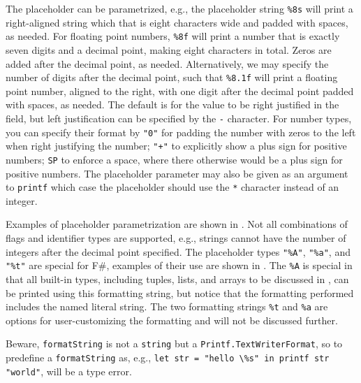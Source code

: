 \documentclass[fsharpnotes.tex]{subfiles}
\begin{document}
The placeholder can be parametrized, e.g.,  the placeholder string \lstinline{%8s} %
will print a right-aligned string which that is eight characters wide and padded with spaces, as needed. For floating point numbers, \lstinline{%8f} %
will print a number that is exactly seven digits and a decimal point, making eight characters in total. Zeros are added after the decimal point, as needed. Alternatively, we may specify the number of digits after the decimal point, such that \lstinline{%8.1f} %
will print a floating point number, aligned to the right, with one digit after the decimal point padded with spaces, as needed. The default is for the value to be right justified in the field, but left justification can be specified by the \lstinline!-! character. For number types, you can specify their format by \lstinline!"0"! for padding the number with zeros to the left when right justifying the number; \lstinline!"+"! to explicitly show a plus sign for positive numbers; \lstinline!SP! to enforce a space, where there otherwise would be a plus sign for positive numbers. The placeholder parameter may also be given as an argument to \lstinline{printf} which case the placeholder should use the \lstinline!*! character instead of an integer.

Examples of placeholder parametrization are shown in .
%
%
Not all combinations of flags and identifier types are supported, e.g., strings cannot have the number of integers after the decimal point specified.
The placeholder types \lstinline{"%A"}, %
\lstinline{"%a"}, %
and \lstinline{"%t"} %
are special for F\#, examples of their use are shown in .
%
%
The \lstinline!%A! %
is special in that all built-in types, including tuples, lists, and arrays to be discussed in , can be printed using this formatting string, but notice that the formatting performed includes the named literal string. The two formatting strings \lstinline!%t! %
and \lstinline!%a! %
are options for user-customizing the formatting and will not be discussed further.

Beware, \lstinline[language=ebnf]!formatString! is not a \lstinline!string! but a \lstinline!Printf.TextWriterFormat!, so to predefine a \lstinline[language=ebnf]!formatString! as, e.g., \mbox{\lstinline{let str = "hello \%s" in printf str "world"}}, will be a type error.
\end{document}
